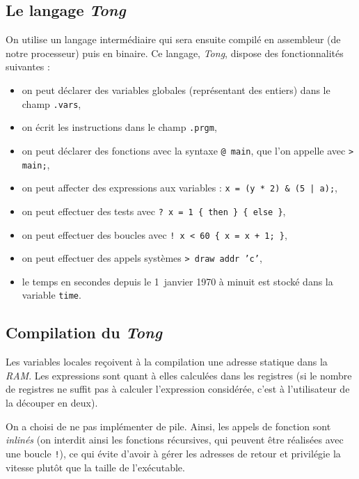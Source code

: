 \documentclass[a4paper, 10pt, french]{article}
\newcommand{\code}[1]{\texttt{#1}}
\newcommand{\foreign}[1]{\emph{#1}}
\begin{document}
\subsection{Le langage \foreign{Tong}}

On utilise un langage intermédiaire qui sera ensuite compilé en assembleur (de notre processeur) puis en binaire. Ce langage, \foreign{Tong}, dispose des fonctionnalités suivantes :
\begin{itemize}
 \item on peut déclarer des variables globales (représentant des entiers) dans le champ \code{.vars},
 \item on écrit les instructions dans le champ \code{.prgm},
 \item on peut déclarer des fonctions avec la syntaxe \code{@ main}, que l'on appelle avec \code{> main;},
 \item on peut affecter des expressions aux variables : \code{x = (y * 2) \& (5 | a);},
 \item on peut effectuer des tests avec \code{? x = 1 \{ then \} \{ else \}},
 \item on peut effectuer des boucles avec \code{! x < 60 \{ x = x + 1; \}},
 \item on peut effectuer des appels systèmes \code{> draw addr 'c'},
 \item le temps en secondes depuis le 1\ier\ janvier 1970 à minuit est stocké dans la variable \code{time}.
\end{itemize}

\subsection{Compilation du \foreign{Tong}}

Les variables locales reçoivent à la compilation une adresse statique dans la \foreign{RAM}. Les expressions sont quant à elles calculées dans les registres (si le nombre de registres ne suffit pas à calculer l'expression considérée, c'est à l'utilisateur de la découper en deux).

On a choisi de ne pas implémenter de pile. Ainsi, les appels de fonction sont \foreign{inlinés} (on interdit ainsi les fonctions récursives, qui peuvent être réalisées avec une boucle \code{!}), ce qui évite d'avoir à gérer les adresses de retour et privilégie la vitesse plutôt que la taille de l'exécutable.
\end{document}
